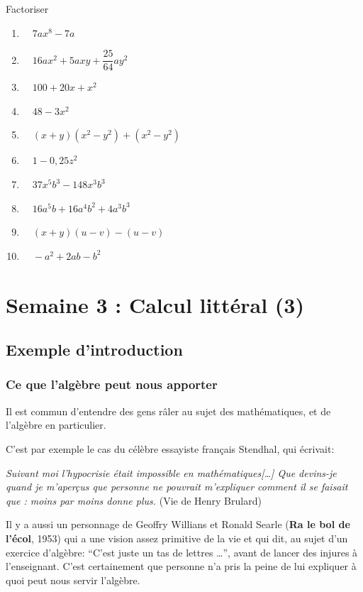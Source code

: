 \documentclass[
  12pt,
]{book}
\providecommand{\tightlist}{%
  \setlength{\itemsep}{0pt}\setlength{\parskip}{0pt}}
\begin{document}
Factoriser

\begin{enumerate}
\def\labelenumi{\arabic{enumi}.}
\tightlist
\item
  \(\quad 7ax^8-7a\)
\item
  \(\quad 16ax^2+5axy+\dfrac{25}{64}ay^2\)
\item
  \(\quad 100+20x+x^2\)
\item
  \(\quad 48-3x^2\)
\item
  \(\quad (x+y)(x^2-y^2)+(x^2-y^2)\)
\item
  \(\quad 1 - 0{,}25z^2\)
\item
  \(\quad 37x^5b^3-148x^3b^3\)
\item
  \(\quad 16a^5b+16a^4b^2+4a^3b^3\)
\item
  \(\quad (x+y)(u-v)-(u-v)\)
\item
  \(\quad -a^2+2ab-b^2\)
\end{enumerate}

\hypertarget{semaine-3-calcul-littuxe9ral-3}{%
\chapter{Semaine 3 : Calcul littéral (3)}\label{semaine-3-calcul-littuxe9ral-3}}

\hypertarget{exemple-dintroduction-2}{%
\section{Exemple d'introduction}\label{exemple-dintroduction-2}}

\hypertarget{ce-que-lalguxe8bre-peut-nous-apporter}{%
\subsection{Ce que l'algèbre peut nous apporter}\label{ce-que-lalguxe8bre-peut-nous-apporter}}

Il est commun d'entendre des gens râler au sujet des mathématiques, et de l'algèbre en particulier.

C'est par exemple le cas du célèbre essayiste français Stendhal, qui écrivait:

\emph{Suivant moi l'hypocrisie était impossible en mathématiques{[}\ldots{]} Que devins-je quand je m'aperçus que personne ne pouvrait m'expliquer comment il se faisait que : moins par moins donne plus.} (Vie de Henry Brulard)

Il y a aussi un personnage de Geoffry Willians et Ronald Searle (\textbf{Ra le bol de l'écol}, 1953) qui a une vision assez primitive de la vie et qui dit, au sujet d'un exercice d'algèbre: ``C'est juste un tas de lettres \ldots{}'', avant de lancer des injures à l'enseignant. C'est certainement que personne n'a pris la peine de lui expliquer à quoi peut nous servir l'algèbre.
\end{document}
